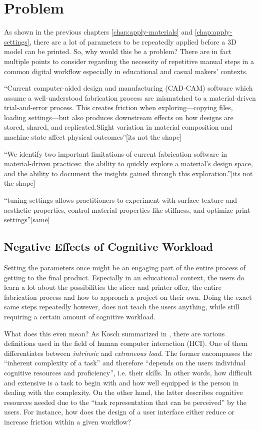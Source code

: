 \chapter{Problem}\label{ch:problem}

As shown in the previous chapters \ref{chap:apply-materials} and \ref{chap:apply-settings}, there are a lot of parameters to be repeatedly applied before a 3D model can be printed. 
So, why would this be a problem? 
There are in fact multiple points to consider regarding the necessity of repetitive manual steps in a common digital workflow especially in educational and casual makers' contexts. 

``Current computer-aided design and manufacturing (CAD-CAM) software which assume a well-understood fabrication process are mismatched to a material-driven trial-and-error process. This creates friction when exploring—copying files, loading settings—but also produces downstream effects on how designs are stored, shared, and replicated.Slight variation in material composition and machine state affect physical outcomes''[its not the shape]

``We identify two important limitations of current fabrication software in material-driven practices: the ability to quickly explore a material’s design space, and the ability to document the insights gained through this exploration.''[its not the shape]

``tuning settings allows practitioners to experiment with surface texture and aesthetic properties, control material properties like stiffness, and optimize print settings''[same]

\section{Negative Effects of Cognitive Workload}

Setting the parameters once might be an engaging part of the entire process of getting to the final product. 
Especially in an educational context, the users do learn a lot about the possibilities the slicer and printer offer, the entire fabrication process and how to approach a project on their own. 
Doing the exact same steps repeatedly however, does not teach the users anything, while still requiring a certain amount of cognitive workload. 

What does this even mean? 
As Kosch \etal summarized in \cite{kosch_survey_2023}, there are various definitions used in the field of human computer interaction (HCI).
One of them differentiates between \textit{intrinsic} and \textit{extraneous load}.
The former encompasses the ``inherent complexity of a task'' and therefore ``depends on the users individual cognitive resources and proficiency'', i.e. their skills. 
In other words, how difficult and extensive is a task to begin with and how well equipped is the person in dealing with the complexity. 
On the other hand, the latter describes cognitive resources needed due to the ``task representation that can be perceived'' by the users.
For instance, how does the design of a user interface either reduce or increase friction within a given workflow?


